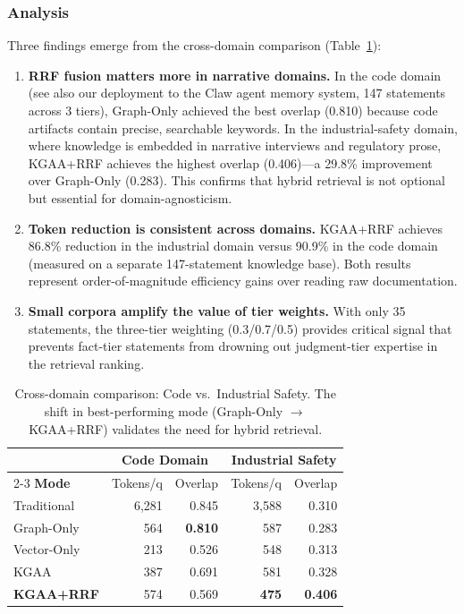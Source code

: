 \documentclass[11pt,a4paper]{article}
\begin{document}
\subsubsection{Analysis}

Three findings emerge from the cross-domain comparison (Table~\ref{tab:comparison}):

\begin{enumerate}
    \item \textbf{RRF fusion matters more in narrative domains.} In the code domain (see also our deployment to the Claw agent memory system, 147 statements across 3 tiers), Graph-Only achieved the best overlap (0.810) because code artifacts contain precise, searchable keywords. In the industrial-safety domain, where knowledge is embedded in narrative interviews and regulatory prose, KGAA+RRF achieves the highest overlap (0.406)---a 29.8\% improvement over Graph-Only (0.283). This confirms that hybrid retrieval is not optional but essential for domain-agnosticism.

    \item \textbf{Token reduction is consistent across domains.} KGAA+RRF achieves 86.8\% reduction in the industrial domain versus 90.9\% in the code domain (measured on a separate 147-statement knowledge base). Both results represent order-of-magnitude efficiency gains over reading raw documentation.

    \item \textbf{Small corpora amplify the value of tier weights.} With only 35 statements, the three-tier weighting (0.3/0.7/0.5) provides critical signal that prevents fact-tier statements from drowning out judgment-tier expertise in the retrieval ranking.
\end{enumerate}

\begin{table}[ht]
\centering
\caption{Cross-domain comparison: Code vs.\ Industrial Safety. The shift in best-performing mode (Graph-Only $\rightarrow$ KGAA+RRF) validates the need for hybrid retrieval.}
\label{tab:comparison}
\begin{tabular}{lrrrr}
\hline
& \multicolumn{2}{c}{\textbf{Code Domain}} & \multicolumn{2}{c}{\textbf{Industrial Safety}} \\
\cline{2-3} \cline{4-5}
\textbf{Mode} & Tokens/q & Overlap & Tokens/q & Overlap \\
\hline
Traditional & 6,281 & 0.845 & 3,588 & 0.310 \\
Graph-Only & 564 & \textbf{0.810} & 587 & 0.283 \\
Vector-Only & 213 & 0.526 & 548 & 0.313 \\
KGAA & 387 & 0.691 & 581 & 0.328 \\
\textbf{KGAA+RRF} & 574 & 0.569 & \textbf{475} & \textbf{0.406} \\
\hline
\end{tabular}
\end{table}
\end{document}
